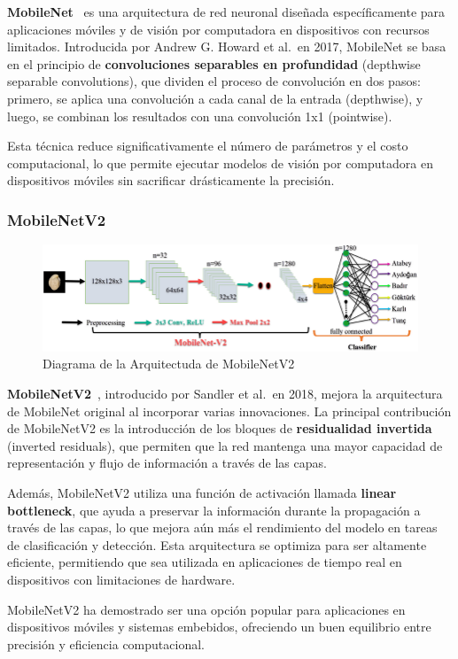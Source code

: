 \textbf{MobileNet}~\cite{howard_mobilenets_2017} es una arquitectura de red neuronal diseñada específicamente para
aplicaciones móviles y de visión por computadora en dispositivos con recursos limitados.
Introducida por Andrew G. Howard et al.\ en 2017, MobileNet se basa en el principio de
\textbf{convoluciones separables en profundidad} (depthwise separable convolutions), que dividen el proceso de
convolución en dos pasos: primero, se aplica una convolución a cada canal de la entrada (depthwise), y luego, se
combinan los resultados con una convolución 1x1 (pointwise).


Esta técnica reduce significativamente el número de parámetros y el costo computacional, lo que permite ejecutar
modelos de visión por computadora en dispositivos móviles sin sacrificar drásticamente la precisión.

\subsubsection{MobileNetV2}\label{subsubsec:mobilenetv2}

\begin{figure}[htp] \label{fig:mobilenetv2}
    \begin{center}
        \includegraphics[width=1\textwidth]{imagenes/mobilenetv2}
    \end{center}
    \caption[MobileNetV2]{Diagrama de la Arquitectuda de MobileNetV2}
\end{figure}

\textbf{MobileNetV2}~\cite{sandler_mobilenetv2_2019}, introducido por Sandler et al.\ en 2018, mejora la arquitectura
de MobileNet original al incorporar varias innovaciones.
La principal contribución de MobileNetV2 es la introducción de los bloques de \textbf{residualidad invertida} (inverted
residuals), que permiten que la red mantenga una mayor capacidad de representación y flujo de información a través de
las capas.


Además, MobileNetV2 utiliza una función de activación llamada \textbf{linear bottleneck}, que ayuda a preservar la
información durante la propagación a través de las capas, lo que mejora aún más el rendimiento del modelo en tareas de
clasificación y detección.
Esta arquitectura se optimiza para ser altamente eficiente, permitiendo que sea utilizada en aplicaciones de tiempo
real en dispositivos con limitaciones de hardware.


MobileNetV2 ha demostrado ser una opción popular para aplicaciones en dispositivos móviles y sistemas embebidos,
ofreciendo un buen equilibrio entre precisión y eficiencia computacional.
